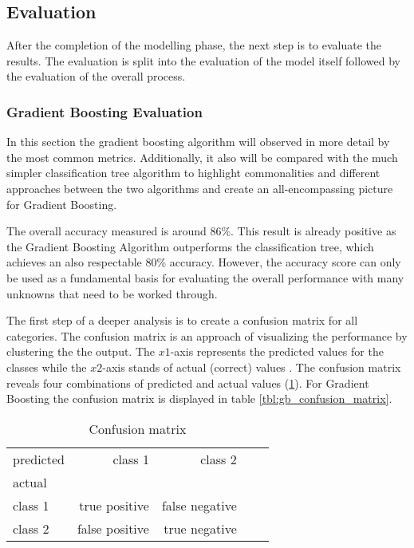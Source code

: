 \subsection{Evaluation}

After the completion of the modelling phase, the next step is to evaluate the results. The evaluation is split into 
the evaluation of the model itself followed by the evaluation of the overall process. 

\subsubsection{Gradient Boosting Evaluation}

In this section the gradient boosting algorithm will observed in more detail by the most common metrics. Additionally, it also
will be compared with the much simpler classification tree algorithm to highlight commonalities and different approaches between 
the two algorithms and create an all-encompassing picture for Gradient Boosting. 

The overall accuracy measured is around \(86\)\%. This result is already positive as the Gradient Boosting Algorithm outperforms 
the classification tree, which achieves an also respectable \(80\)\% accuracy. However, the accuracy score can only be used as a
fundamental basis for evaluating the overall performance with many unknowns that need to be worked through.

The first step of a deeper analysis is to create a confusion matrix for all categories. The confusion matrix is an approach of 
visualizing the performance by clustering the the output. The \(x1\)-axis represents the predicted values for the classes 
while the \(x2\)-axis stands of actual (correct) values \cite[p.235]{Davis_2006}. The confusion matrix reveals four combinations of predicted 
and actual values (\ref{tbl:evaluation_confusion_matrix}). For Gradient Boosting the confusion matrix is displayed in table \ref{tbl:gb_confusion_matrix}.

\begin{table}[H]
  \centering
  \begin{tabular}{lrrrr}
    \toprule
    predicted & class 1         &  class 2          \\
    actual    &                 &                   \\
    \midrule
    class 1   &  true positive  &  false negative   \\
    class 2   &  false positive &  true negative    \\
    \bottomrule
    \end{tabular}
  \caption{Confusion matrix}%
  \label{tbl:evaluation_confusion_matrix}%
\end{table} 

